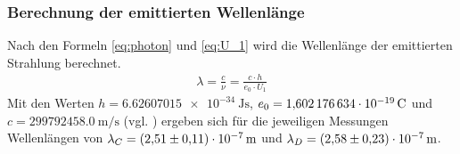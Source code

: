 \subsubsection{Berechnung der emittierten Wellenlänge}
Nach den Formeln \eqref{eq:photon} und \eqref{eq:U_1} wird die Wellenlänge der emittierten Strahlung berechnet.
\begin{align}
    \lambda = \frac{c}{\nu} = \frac{c \cdot h}{e_0 \cdot U_1}
\end{align}
Mit den Werten $h=\qty{6.62607015e-34}{\joule\s}$, $e_0 = \qty{1.602176634e-19}{\C}$ 
und $c = \qty{299792458.0}{\meter\per\second}$ (vgl. \cite{scipy})
ergeben sich für die jeweiligen Messungen Wellenlängen von $\lambda_C = \qty{ 2.51 +- 0.11 e-07}{\m}$ und $\lambda_D= \qty{2.58 +- 0.23 e-07}{\m}$.
